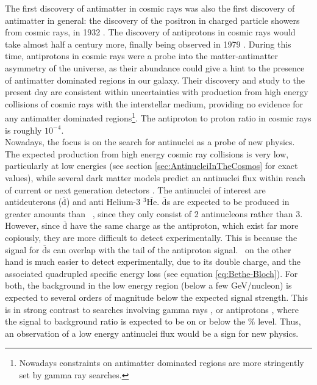 The first discovery of antimatter in cosmic rays was also the first discovery of antimatter in general: the discovery of the positron in charged particle showers from cosmic rays, in 1932 \cite{positron_discovery}. The discovery of antiprotons in cosmic rays would take almost half a century more, finally being observed in 1979 \cite{antiproton_CR_discovery, Bogomolov:1979hu}. During this time, antiprotons in cosmic rays were a probe into the matter-antimatter asymmetry of the universe, as their abundance could give a hint to the presence of antimatter dominated regions in our galaxy. Their discovery and study to the present day are consistent within uncertainties with production from high energy collisions of cosmic rays with the interstellar medium, providing no evidence for any antimatter dominated regions\footnote{Nowadays constraints on antimatter dominated regions are more stringently set by gamma ray searches.}. The antiproton to proton ratio in cosmic rays is roughly $10^{-4}$. \\

Nowadays, the focus is on the search for antinuclei as a probe of new physics. The expected production from high energy cosmic ray collisions is very low, particularly at low energies (see section \ref{sec:AntinucleiInTheCosmos} for exact values), while several dark matter models predict an antinuclei flux within reach of current or next generation detectors \cite{Doetinchem_2020_review}. The antinuclei of interest are antideuterons ($\overline{\mathrm{d}}$) and anti Helium-3 $^3\overline{\mathrm{He}}$. $\overline{\mathrm{d}}$s are expected to be produced in greater amounts than \ahe\ , since they only consist of 2 antinucleons rather than 3. However, since $\overline{\mathrm{d}}$ have the same charge as the antiproton, which exist far more copiously, they are more difficult to detect experimentally. This is because the signal for $\overline{\mathrm{d}}$s can overlap with the tail of the antiproton signal. \ahe\ on the other hand is much easier to detect experimentally, due to its double charge, and the associated quadrupled specific energy loss (see equation \ref{eq:Bethe-Bloch}).
For both, the background in the low energy region (below a few GeV/nucleon) is expected to several orders of magnitude below the expected signal strength. This is in strong contrast to searches involving gamma rays \cite{Gamma_DM_searches}, or antiprotons \cite{AMS_pbar_interpretation1, AMS_pbar_systematics_discussion}, where the signal to background ratio is expected to be on or below the \% level. Thus, an observation of a low energy antinuclei flux would be a sign for new physics. 

